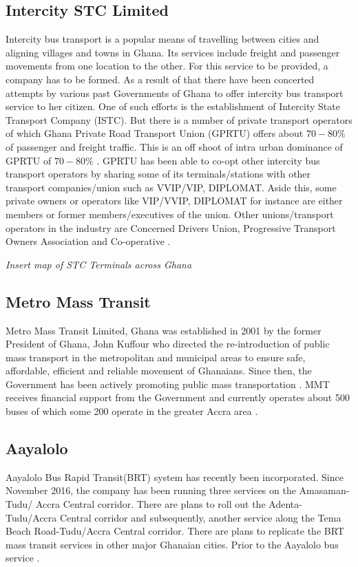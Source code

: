 \subsection{Intercity STC Limited}
Intercity bus transport is a popular means of travelling between cities and aligning villages and towns in Ghana. Its services include freight and passenger movements from one location to the other. For this service to be provided, a company has to be formed. As a result of that there have been concerted attempts by various past Governments of Ghana to offer intercity bus transport service to her citizen. One of such efforts is the establishment of Intercity State Transport Company (ISTC). But there is a number of private transport operators 
of which Ghana Private Road Transport Union (GPRTU) offers about $70-80\%$ of passenger and freight traffic. This is an off shoot of intra urban dominance of GPRTU of $70-80\%$ \citep{abane2011travel}. GPRTU has been able to co-opt other intercity bus transport operators by sharing some of its terminals/stations with other transport 
companies/union such as VVIP/VIP, DIPLOMAT. Aside this, some private owners or operators like VIP/VVIP, DIPLOMAT for instance are either members or former members/executives of the union. Other unions/transport operators in the industry are Concerned Drivers Union, Progressive Transport Owners Association and Co-operative \citep{ojobus}.

\textit{Insert map of STC Terminals across Ghana}

\subsection{Metro Mass Transit}
Metro  Mass  Transit  Limited, Ghana was established in 2001 by the former President of Ghana, John Kuffour who directed the re-introduction of public mass transport in the metropolitan and municipal areas to ensure safe, affordable, efficient and reliable movement of Ghanaians. Since then, the Government has been actively promoting public mass transportation \citep{olateju2009appraisal}. MMT receives financial support from the Government and currently operates about 500 buses of which some 200 operate in the greater Accra area \citep{finn2009new}.

\subsection{Aayalolo}
Aayalolo Bus Rapid Transit(BRT) system has recently been incorporated. Since November 2016, the company has been running three services on the Amasaman-Tudu/
Accra Central corridor. There are plans to roll out the Adenta-Tudu/Accra Central corridor and subsequently, another service along the Tema Beach Road-Tudu/Accra Central corridor. There are plans to replicate the BRT mass transit services in other major Ghanaian cities. Prior to the Aayalolo bus service \citep{agyemang2017mode}.

